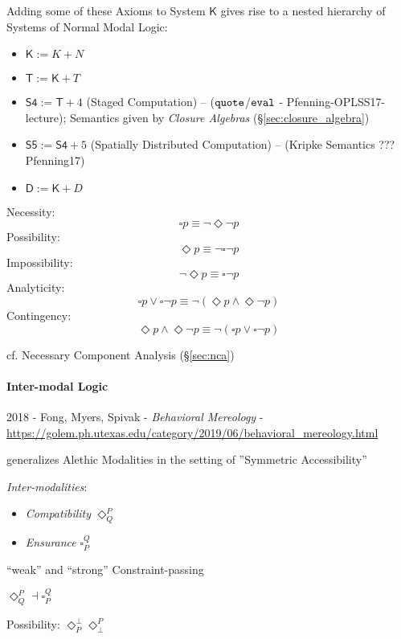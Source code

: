 Adding some of these Axioms to System $\mathsf{K}$ gives rise to a
nested hierarchy of Systems of Normal Modal Logic:
\begin{itemize}
  \item $\mathsf{K} := K + N$
  \item $\mathsf{T} := \mathsf{K} + T$
  \item $\mathsf{S4} := \mathsf{T} + 4$ (Staged Computation)
    \cite{wadler14} -- ($\mathtt{quote}$/$\mathtt{eval}$ -
    Pfenning-OPLSS17-lecture); Semantics given by \emph{Closure Algebras}
    (\S\ref{sec:closure_algebra})
  \item $\mathsf{S5} := \mathsf{S4} + 5$
    (Spatially Distributed Computation) \cite{wadler14} -- (Kripke
    Semantics ??? Pfenning17)
  \item $\mathsf{D} := \mathsf{K} + D$
\end{itemize}

Necessity:
\[
  \square p \equiv \neg \Diamond \neg p
\]
Possibility:
\[
  \Diamond p \equiv \neg \square \neg p
\]
Impossibility:
\[
  \neg \Diamond p \equiv \square \neg p
\]
Analyticity:
\[
  \square p \vee \square \neg p
  \equiv \neg (\Diamond p \wedge \Diamond \neg p)
\]
Contingency:
\[
  \Diamond p \wedge \Diamond \neg p
  \equiv \neg (\square p \vee \square \neg p)
\]

\fist cf. Necessary Component Analysis (\S\ref{sec:nca})



\paragraph{Inter-modal Logic}\label{sec:intermodal_logic}\hfill

2018 - Fong, Myers, Spivak - \emph{Behavioral Mereology} -
\url{https://golem.ph.utexas.edu/category/2019/06/behavioral_mereology.html}

generalizes Alethic Modalities in the setting of ''Symmetric Accessibility''

\emph{Inter-modalities}:
\begin{itemize}
  \item \emph{Compatibility} $\Diamond^P_Q$
  \item \emph{Ensurance} $\square^Q_P$
\end{itemize}
``weak'' and ``strong'' Constraint-passing

$\Diamond^P_Q \dashv \square^Q_P$

Possibility: $\Diamond^{\bot}_P \Diamond^P_{\bot}$

